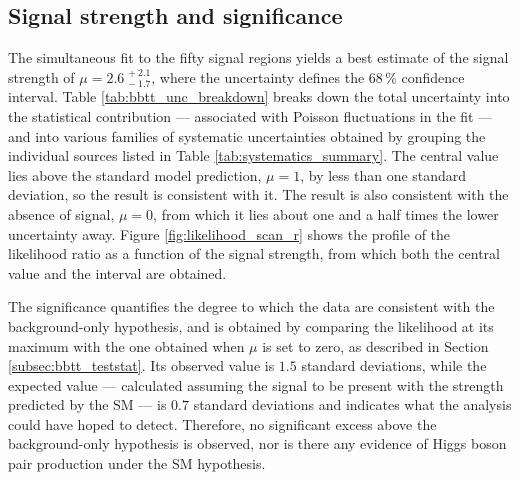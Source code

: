 


\subsection{Signal strength and significance}
\label{subsec:bbtt_mu}
%
The simultaneous fit to the fifty signal regions yields a best estimate of the signal strength of $\mu = 2.6^{\,+2.1}_{\,-1.7}$, where the uncertainty defines the $68\,\%$ confidence interval. Table \ref{tab:bbtt_unc_breakdown} breaks down the total uncertainty into the statistical contribution — associated with Poisson fluctuations in the fit — and into various families of systematic uncertainties obtained by grouping the individual sources listed in Table \ref{tab:systematics_summary}. The central value lies above the standard model prediction, $\mu = 1$, by less than one standard deviation, so the result is consistent with it. The result is also consistent with the absence of signal, $\mu = 0$, from which it lies about one and a half times the lower uncertainty away. Figure \ref{fig:likelihood_scan_r} shows the profile of the likelihood ratio as a function of the signal strength, from which both the central value and the interval are obtained.

The significance quantifies the degree to which the data are consistent with the background-only hypothesis, and is obtained by comparing the likelihood at its maximum with the one obtained when $\mu$ is set to zero, as described in Section \ref{subsec:bbtt_teststat}. Its observed value is $1.5$ standard deviations, while the expected value — calculated assuming the signal to be present with the strength predicted by the SM — is $0.7$ standard deviations and indicates what the analysis could have hoped to detect. Therefore, no significant excess above the background-only hypothesis is observed, nor is there any evidence of Higgs boson pair production under the SM hypothesis.\medskip



